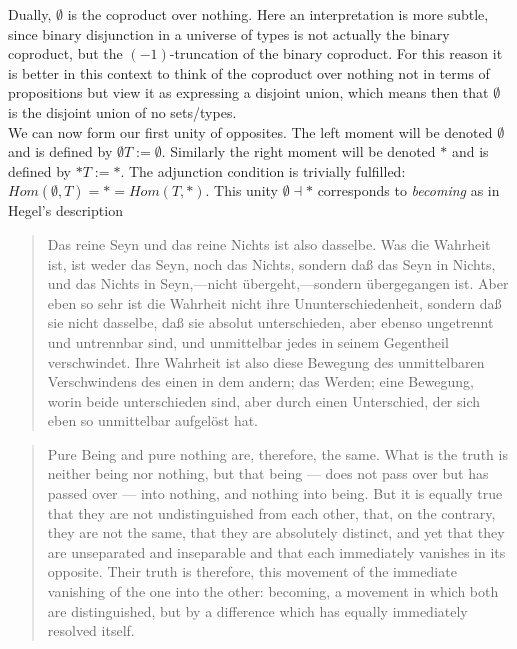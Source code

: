 \documentclass{article}
\begin{document}
Dually, $\emptyset$ is the coproduct over nothing. Here an interpretation is more subtle, since binary disjunction in a universe of types is not actually the binary coproduct, but the $(-1)$-truncation of the binary coproduct. For this reason it is better in this context to think of the coproduct over nothing not in terms of propositions but view it as expressing a disjoint union, which means then that $\emptyset$ is the disjoint union of no sets/types. \\

We can now form our first unity of opposites. The left moment will be denoted $\emptyset$ and is defined by $\emptyset T:= \emptyset$. Similarly the right moment will be denoted $*$ and is defined by $* T:= *$. The adjunction condition is trivially fulfilled: $Hom(\emptyset, T)=*=Hom(T, *)$. This unity $\emptyset\dashv *$ corresponds to \emph{becoming} as in Hegel's description

\begin{quote}
    Das reine Seyn und das reine Nichts ist also dasselbe. Was die Wahrheit ist, ist weder das Seyn, noch das Nichts, sondern daß das Seyn in Nichts, und das Nichts in Seyn,—nicht übergeht,—sondern übergegangen ist. Aber eben so sehr ist die Wahrheit nicht ihre Ununterschiedenheit, sondern daß sie nicht dasselbe, daß sie absolut unterschieden, aber ebenso ungetrennt und untrennbar sind, und unmittelbar jedes in seinem Gegentheil verschwindet. Ihre Wahrheit ist also diese Bewegung des unmittelbaren Verschwindens des einen in dem andern; das Werden; eine Bewegung, worin beide unterschieden sind, aber durch einen Unterschied, der sich eben so unmittelbar aufgelöst hat.
\end{quote}

\begin{quote}
    Pure Being and pure nothing are, therefore, the same. What is the truth is neither being nor nothing, but that being — does not pass over but has passed over — into nothing, and nothing into being. But it is equally true that they are not undistinguished from each other, that, on the contrary, they are not the same, that they are absolutely distinct, and yet that they are unseparated and inseparable and that each immediately vanishes in its opposite. Their truth is therefore, this movement of the immediate vanishing of the one into the other: becoming, a movement in which both are distinguished, but by a difference which has equally immediately resolved itself.
\end{quote}
    
\end{document}
